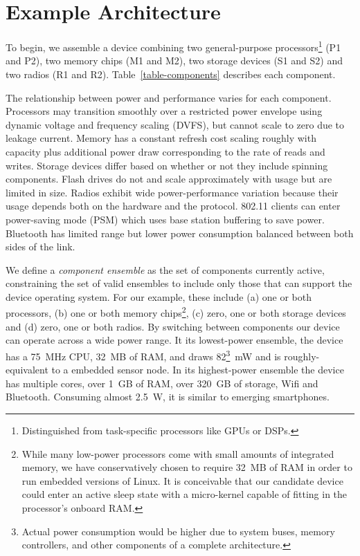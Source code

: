 \vspace*{-0.1in}
\section{Example Architecture}
\label{section-architecture}



To begin, we assemble a device combining two general-purpose
processors\footnote{Distinguished from task-specific processors like GPUs or
DSPs.} (P1 and P2), two memory chips (M1 and M2), two storage devices (S1 and
S2) and two radios (R1 and R2). Table~\ref{table-components} describes each
component.

The relationship between power and performance varies for each component.
Processors may transition smoothly over a restricted power envelope using
dynamic voltage and frequency scaling (DVFS), but cannot scale to zero due to
leakage current. Memory has a constant refresh cost scaling roughly with
capacity plus additional power draw corresponding to the rate of reads and
writes. Storage devices differ based on whether or not they include spinning
components. Flash drives do not and scale approximately with usage but are
limited in size. Radios exhibit wide power-performance variation because
their usage depends both on the hardware and the protocol. 802.11 clients can
enter power-saving mode (PSM) which uses base station buffering to save
power. Bluetooth has limited range but lower power consumption balanced
between both sides of the link.

We define a \textit{component ensemble} as the set of components currently
active, constraining the set of valid ensembles to include only those that
can support the device operating system. For our example, these include (a)
one or both processors, (b) one or both memory chips\footnote{While many
low-power processors come with small amounts of integrated memory, we have
conservatively chosen to require 32~MB of RAM in order to run embedded
versions of Linux. It is conceivable that our candidate device could enter an
active sleep state with a micro-kernel capable of fitting in the processor's
onboard RAM.}, (c) zero, one or both storage devices and (d) zero, one or
both radios. By switching between components our device can operate across a
wide power range. It its lowest-power ensemble, the device has a 75~MHz CPU,
32~MB of RAM, and draws 82\footnote{Actual power consumption would be higher
due to system buses, memory controllers, and other components of a complete
architecture.}~mW and is roughly-equivalent to a embedded sensor node. In its
highest-power ensemble the device has multiple cores, over 1~GB of RAM, over
320~GB of storage, Wifi and Bluetooth. Consuming almost 2.5~W, it is similar
to emerging smartphones.


